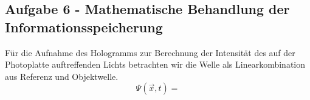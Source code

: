 \subsection*{Aufgabe 6 - Mathematische Behandlung der Informationsspeicherung}
Für die Aufnahme des Hologramms zur Berechnung der Intensität des auf der Photoplatte auftreffenden Lichts betrachten wir die Welle als Linearkombination aus Referenz und Objektwelle.
\begin{equation}
	\Psi(\vec{x},t) = 
\end{equation}